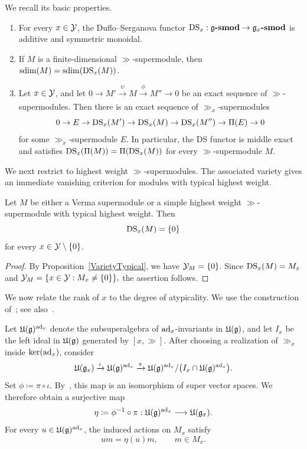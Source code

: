We recall its basic properties.

\begin{lemma}\label{DSTensorFunctor}
\begin{enumerate}
\item[(a)] For every $x\in{\mathcal Y}$, the Duflo--Serganova functor
$
\operatorname{DS}_{x}:{\mathfrak{g}}\textbf{-smod}\to{\mathfrak{g}}_{x}\textbf{-smod}
$
is additive and symmetric monoidal.
\item[(b)] If $M$ is a finite-dimensional $\gg$-supermodule, then $\operatorname{sdim}(M)=\operatorname{sdim}(\operatorname{DS}_{x}(M))$.
\item[(c)] Let $x\in{\mathcal Y}$, and let
$
0\to M'\xrightarrow[]{\psi}M\xrightarrow[]{\phi}M''\to0
$
be an exact sequence of $\gg$-supermodules. Then there is an exact sequence of $\gg_{x}$-supermodules
\[
0\to E\to\operatorname{DS}_{x}(M')\to\operatorname{DS}_{x}(M)\to\operatorname{DS}_{x}(M'')\to\Pi(E)\to0
\]
for some $\gg_{x}$-supermodule $E$. In particular, the DS functor is middle exact and satisfies
$
\operatorname{DS}_{x}(\Pi(M))=\Pi(\operatorname{DS}_{x}(M))
$
for every $\gg$-supermodule $M$.
\end{enumerate}
\end{lemma}

We next restrict to highest weight $\gg$-supermodules. The associated variety gives an immediate vanishing criterion for modules with typical highest weight.

\begin{proposition}
Let $M$ be either a Verma supermodule or a simple highest weight $\gg$-supermodule with typical highest weight. Then
\[
\operatorname{DS}_{x}(M)=\{0\}
\]
for every $x\in{\mathcal Y}\setminus\{0\}$.
\end{proposition}

\begin{proof}
By Proposition~\ref{VarietyTypical}, we have ${\mathcal Y}_{M}=\{0\}$. Since
$
\operatorname{DS}_{x}(M)=M_{x}
$
and
$
{\mathcal Y}_{M}=\{x\in{\mathcal Y}:M_{x}\neq\{0\}\},
$
the assertion follows.
\end{proof}

We now relate the rank of $x$ to the degree of atypicality. We use the construction of~\cite[Section~6]{duflo2005associated}; see also~\cite{serganova2011superdimension}.

Let ${\mathfrak U}({\mathfrak{g}})^{\operatorname{ad}_{x}}$ denote the subsuperalgebra of $\operatorname{ad}_{x}$-invariants in ${\mathfrak U}({\mathfrak{g}})$, and let $I_{x}$ be the left ideal in ${\mathfrak U}({\mathfrak{g}})$ generated by $[x,\gg]$. After choosing a realization of $\gg_{x}$ inside $\operatorname{ker}(\operatorname{ad}_{x})$, consider
\begin{equation}
{\mathfrak U}({\mathfrak{g}}_{x})
\xrightarrow{\iota}
{\mathfrak U}({\mathfrak{g}})^{\operatorname{ad}_{x}}
\xrightarrow{\pi}
{\mathfrak U}({\mathfrak{g}})^{\operatorname{ad}_{x}}/
\bigl(I_{x}\cap{\mathfrak U}({\mathfrak{g}})^{\operatorname{ad}_{x}}\bigr).
\end{equation}
Set $\phi\coloneqq \pi\circ\iota$. By~\cite[Lemma~6.6]{duflo2005associated}, this map
is an isomorphism of super vector spaces. We therefore obtain a surjective map
\begin{equation}
\eta\coloneqq \phi^{-1}\circ\pi:
{\mathfrak U}({\mathfrak{g}})^{\operatorname{ad}_{x}}\longrightarrow{\mathfrak U}({\mathfrak{g}}_{x}).
\end{equation}
For every $u\in{\mathfrak U}({\mathfrak{g}})^{\operatorname{ad}_{x}}$, the induced actions on $M_{x}$ satisfy
\begin{equation}
u m=\eta(u)m,
\qquad
m\in M_{x}.
\end{equation}

